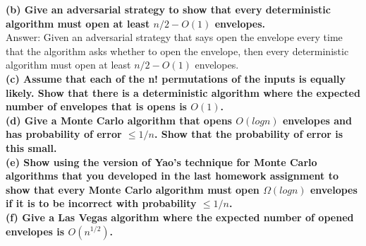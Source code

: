 \documentclass{article}
\begin{document}
\textbf{(b) Give an adversarial strategy to show that every deterministic algorithm must open at least $n/2 - O(1)$ envelopes.} \\ \newline
Answer: Given an adversarial strategy that says open the envelope every time that the algorithm asks whether to open the envelope, then every deterministic algorithm must open at least $n/2 - O(1)$ envelopes. \\ \newline
\textbf{(c) Assume that each of the n! permutations of the inputs is equally likely. Show that there is a deterministic algorithm where the expected number of envelopes that is opens is $O(1)$.} \\ \newline
\textbf{(d) Give a Monte Carlo algorithm that opens $O(logn)$ envelopes and has probability of error $\leq 1/n$. Show that the probability of error is this small.} \\ \newline
\textbf{(e) Show using the version of Yao’s technique for Monte Carlo algorithms that you developed in the last homework assignment to show that every Monte Carlo algorithm must open $\Omega(logn)$ envelopes if it is to be incorrect with probability $\leq 1/n$.} \\ \newline
\textbf{(f) Give a Las Vegas algorithm where the expected number of opened envelopes is $O(n^{1/2})$.}
\end{document}
